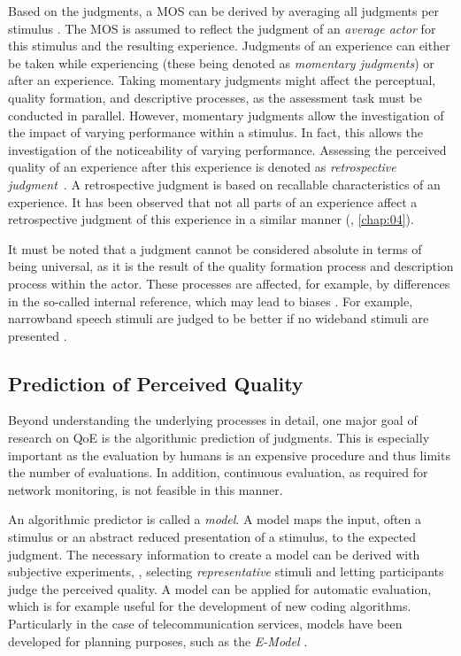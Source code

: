 Based on the judgments, a \acf{MOS} can be derived by averaging all judgments per stimulus \citep{itu-t_recommendation_p.800.2_mean_2013}.
The \ac{MOS} is assumed to reflect the judgment of an \emph{average actor} for this stimulus and the resulting experience.
Judgments of an experience can either be taken while experiencing (these being denoted as \emph{momentary judgments}) or after an experience.
Taking momentary judgments might affect the perceptual, quality formation, and descriptive processes, as the assessment task must be conducted in parallel. %
However, momentary judgments allow the investigation of the impact of varying performance within a stimulus.
In fact, this allows the investigation of the noticeability of varying performance.
Assessing the perceived quality of an experience after this experience is denoted as \emph{retrospective judgment}~\citep[][]{weiss_temporal_2014}.
A retrospective judgment is based on recallable characteristics of an experience.
It has been observed that not all parts of an experience affect a retrospective judgment of this experience in a similar manner (\cf, \autoref{chap:04}).

It must be noted that a judgment cannot be considered absolute in terms of being universal, as it is the result of the quality formation process and description process within the actor.
These processes are affected, for example, by differences in the so-called internal reference, which may lead to biases \citep[][]{zielinski_biases_2008, pitrey_aligning_2011}.
For example, narrowband speech stimuli are judged to be better if no wideband stimuli are presented \citep[][]{koster_comparison_2015}.

\subsection{Prediction of Perceived Quality}
Beyond understanding the underlying processes in detail, one major goal of research on \ac{QoE} is the algorithmic prediction of judgments.
This is especially important as the evaluation by humans is an expensive procedure and thus limits the number of evaluations.
In addition, continuous evaluation, as required for network monitoring, is not feasible in this manner.

An algorithmic predictor is called a \emph{model}.
A model maps the input, often a stimulus or an abstract reduced presentation of a stimulus, to the expected judgment.
The necessary information to create a model can be derived with subjective experiments, \ie, selecting \emph{representative} stimuli and letting participants judge the perceived quality.
A model can be applied for automatic evaluation, which is for example useful for the development of new coding algorithms.
Particularly in the case of telecommunication services, models have been developed for planning purposes, such as the \emph{E-Model} \citep{itu-t_recommendation_g.107_e-model_2015}.

